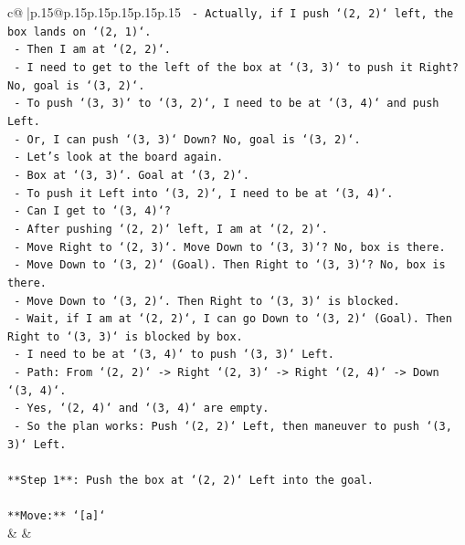 \documentclass{article}
\begin{document}
{\begin{supertabular}{c@{$\;$}|p{.15\linewidth}@{}p{.15\linewidth}p{.15\linewidth}p{.15\linewidth}p{.15\linewidth}p{.15\linewidth}}
{{{\texttt{    {-} Actually, if I push `(2, 2)` left, the box lands on `(2, 1)`.} \\
\texttt{    {-} Then I am at `(2, 2)`.} \\
\texttt{    {-} I need to get to the left of the box at `(3, 3)` to push it Right? No, goal is `(3, 2)`.} \\
\texttt{    {-} To push `(3, 3)` to `(3, 2)`, I need to be at `(3, 4)` and push Left.} \\
\texttt{    {-} Or, I can push `(3, 3)` Down? No, goal is `(3, 2)`.} \\
\texttt{    {-} Let's look at the board again.} \\
\texttt{    {-} Box at `(3, 3)`. Goal at `(3, 2)`.} \\
\texttt{    {-} To push it Left into `(3, 2)`, I need to be at `(3, 4)`.} \\
\texttt{    {-} Can I get to `(3, 4)`?} \\
\texttt{    {-} After pushing `(2, 2)` left, I am at `(2, 2)`.} \\
\texttt{    {-} Move Right to `(2, 3)`. Move Down to `(3, 3)`? No, box is there.} \\
\texttt{    {-} Move Down to `(3, 2)` (Goal). Then Right to `(3, 3)`? No, box is there.} \\
\texttt{    {-} Move Down to `(3, 2)`. Then Right to `(3, 3)` is blocked.} \\
\texttt{    {-} Wait, if I am at `(2, 2)`, I can go Down to `(3, 2)` (Goal). Then Right to `(3, 3)` is blocked by box.} \\
\texttt{    {-} I need to be at `(3, 4)` to push `(3, 3)` Left.} \\
\texttt{    {-} Path: From `(2, 2)` {-}> Right `(2, 3)` {-}> Right `(2, 4)` {-}> Down `(3, 4)`.} \\
\texttt{    {-} Yes, `(2, 4)` and `(3, 4)` are empty.} \\
\texttt{    {-} So the plan works: Push `(2, 2)` Left, then maneuver to push `(3, 3)` Left.} \\
\\ 
\texttt{**Step 1**: Push the box at `(2, 2)` Left into the goal.} \\
\\ 
\texttt{**Move:** `{[}a{]}`} \\
            }
        }
    }
    & & \\ \\


\end{supertabular}}
\end{document}

